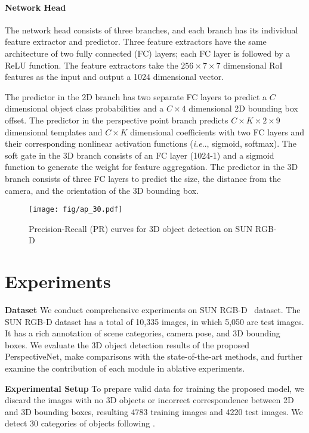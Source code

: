 \documentclass{article}
\makeatletter
\DeclareRobustCommand\onedot{\futurelet\@let@token\@onedot}
\def\@onedot{\ifx\@let@token.\else.\null\fi\xspace}
\def\ie{\emph{i.e}\onedot} \def\Ie{\emph{I.e}\onedot}
\makeatother
\begin{document}
\paragraph{Network Head} The network head consists of three branches, and each branch has its individual feature extractor and predictor. Three feature extractors have the same architecture of two fully connected (FC) layers; each FC layer is followed by a ReLU function. The feature extractors take the $256 \times 7 \times 7$ dimensional RoI features as the input and output a 1024 dimensional vector.

The predictor in the 2D branch has two separate FC layers to predict a $C$ dimensional object class probabilities and a $C \times 4$ dimensional 2D bounding box offset. The predictor in the perspective point branch predicts $C\times K \times 2 \times 9$ dimensional templates and $C \times K$ dimensional coefficients with two FC layers and their corresponding nonlinear activation functions (\ie, sigmoid, softmax). The soft gate in the 3D branch consists of an FC layer (1024-1) and a sigmoid function to generate the weight for feature aggregation. The predictor in the 3D branch consists of three FC layers to predict the size, the distance from the camera, and the orientation of the 3D bounding box.


\begin{figure}[t!]
    \begin{center}
        \texttt{[image: fig/ap\_30.pdf]}
    \end{center}
    \caption{Precision-Recall (PR) curves for 3D object detection on SUN RGB-D}
    \label{fig:pr_30}
\end{figure}

\section{Experiments}

\textbf{Dataset}\quad{} We conduct comprehensive experiments on SUN RGB-D~\cite{song2015sun} dataset. The SUN RGB-D dataset has a total of 10,335 images, in which 5,050 are test images. It has a rich annotation of scene categories, camera pose, and 3D bounding boxes. We evaluate the 3D object detection results of the proposed PerspectiveNet, make comparisons with the state-of-the-art methods, and further examine the contribution of each module in ablative experiments.

\textbf{Experimental Setup}\quad{} To prepare valid data for training the proposed model, we discard the images with no 3D objects or incorrect correspondence between 2D and 3D bounding boxes, resulting 4783 training images and 4220 test images. We detect 30 categories of objects following \citet{huang2018cooperative}.
\end{document}
